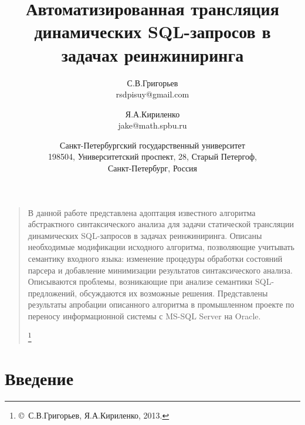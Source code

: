 \documentclass[a5paper]{article}
\title{Автоматизированная трансляция динамических SQL-запросов в задачах реинжиниринга}
\author{С.В.Григорьев\\
rsdpisuy@gmail.com\\
\and
Я.А.Кириленко\\
jake@math.spbu.ru\\
\and Санкт-Петербургский государственный университет\\
198504, Университетский проспект, 28, Старый Петергоф,\\
Санкт-Петербург, Россия}
\date{}
\begin{document}
\maketitle
\thispagestyle{empty}

\begin{quote}
\small\noindent В данной работе представлена адоптация известного алгоритма абстрактного синтаксического анализа для задачи статической трансляции динамических SQL-запросов в задачах реинжиниринга. Описаны необходимые модификации исходного алгоритма, позволяющие учитывать семантику входного языка: изменение процедуры обработки состояний парсера и добавление минимизации результатов синтаксического анализа. Описываются проблемы, возникающие при анализе  семантики SQL-предложений,  обсуждаются их возможные решения. Представлены результаты апробации описанного алгоритма в промышленном проекте по переносу информационной системы с MS-SQL Server на Oracle.

\renewcommand{\thefootnote}{}

\footnote{\small{\copyright~С.В.Григорьев, Я.А.Кириленко, 2013.}}
\renewcommand{\thefootnote}{\arabic{footnote}}
\setcounter{footnote}{0}
\end{quote}

\section*{Введение}
\end{document}
